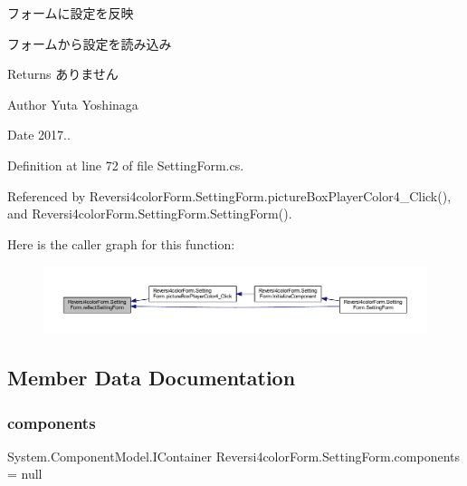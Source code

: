 フォームに設定を反映 

フォームから設定を読み込み

\begin{DoxyReturn}{Returns}
ありません 
\end{DoxyReturn}
\begin{DoxyAuthor}{Author}
Yuta Yoshinaga 
\end{DoxyAuthor}
\begin{DoxyDate}{Date}
2017.. 
\end{DoxyDate}


Definition at line 72 of file Setting\+Form.\+cs.



Referenced by Reversi4color\+Form.\+Setting\+Form.\+picture\+Box\+Player\+Color4\+\_\+\+Click(), and Reversi4color\+Form.\+Setting\+Form.\+Setting\+Form().

Here is the caller graph for this function\+:
\nopagebreak
\begin{figure}[H]
\begin{center}
\leavevmode
\includegraphics[width=350pt]{class_reversi4color_form_1_1_setting_form_a33a42eed1cef78b8906da8ff65874ecd_icgraph}
\end{center}
\end{figure}


\subsection{Member Data Documentation}
\mbox{\label{class_reversi4color_form_1_1_setting_form_aff2698ca8c13967f78ffa2db8be83d50}} 
\subsubsection{\texorpdfstring{components}{components}}
{\footnotesize\ttfamily System.\+Component\+Model.\+I\+Container Reversi4color\+Form.\+Setting\+Form.\+components = null\hspace{0.3cm}{\ttfamily [private]}}



